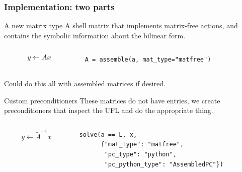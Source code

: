 \documentclass[presentation,aspectratio=43]{beamer}
\begin{document}
\begin{frame}[fragile,t]
  \frametitle{Implementation: two parts}
  \begin{block}{A new matrix type}
    A shell matrix that implements matrix-free actions, and contains
    the symbolic information about the bilinear form.
    \begin{columns}
      \begin{column}{0.5\textwidth}
      \begin{equation*}
        y \leftarrow A x
      \end{equation*}
    \end{column}
    \hspace{-0.1\textwidth}
    \begin{column}{0.7\textwidth}
\begin{verbatim}
A = assemble(a, mat_type="matfree")
\end{verbatim}
    \end{column}
    \end{columns}
    \begin{flushright}
      \footnotesize Could do this all with assembled matrices if desired.
    \end{flushright}
  \end{block}
  \begin{block}{Custom preconditioners}
    These matrices do not have entries, we create preconditioners
    that inspect the UFL and do the appropriate thing.
    \begin{columns}
      \begin{column}{0.5\textwidth}
    \begin{equation*}
      y \leftarrow \tilde{A}^{-1} x
    \end{equation*}
  \end{column}
  \hspace{-0.1\textwidth}
  \begin{column}{0.7\textwidth}
\begin{verbatim}
solve(a == L, x,
      {"mat_type": "matfree",
       "pc_type": "python",
       "pc_python_type": "AssembledPC"})
\end{verbatim}
  \end{column}
  \end{columns}
  \end{block}
\end{frame}
\end{document}

